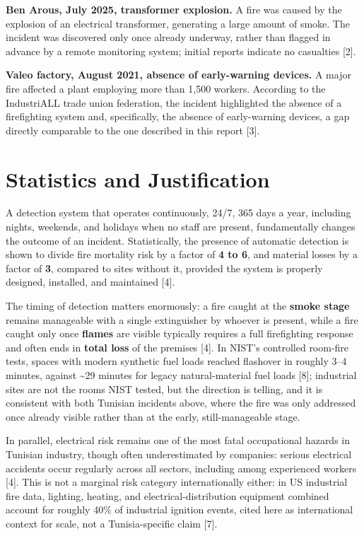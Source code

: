 \documentclass[10pt]{article}
\begin{document}
\textbf{Ben Arous, July 2025, transformer explosion.} A fire was caused by the explosion of an electrical transformer, generating a large amount of smoke. The incident was discovered only once already underway, rather than flagged in advance by a remote monitoring system; initial reports indicate no casualties [2].

\textbf{Valeo factory, August 2021, absence of early-warning devices.} A major fire affected a plant employing more than 1,500 workers. According to the IndustriALL trade union federation, the incident highlighted the absence of a firefighting system and, specifically, the absence of early-warning devices, a gap directly comparable to the one described in this report [3].

\section{Statistics and Justification}
A detection system that operates continuously, 24/7, 365 days a year, including nights, weekends, and holidays when no staff are present, fundamentally changes the outcome of an incident. Statistically, the presence of automatic detection is shown to divide fire mortality risk by a factor of \textbf{4 to 6}, and material losses by a factor of \textbf{3}, compared to sites without it, provided the system is properly designed, installed, and maintained [4].

The timing of detection matters enormously: a fire caught at the \textbf{smoke stage} remains manageable with a single extinguisher by whoever is present, while a fire caught only once \textbf{flames} are visible typically requires a full firefighting response and often ends in \textbf{total loss} of the premises [4]. In NIST's controlled room-fire tests, spaces with modern synthetic fuel loads reached flashover in roughly 3--4 minutes, against \textasciitilde29 minutes for legacy natural-material fuel loads [8]; industrial sites are not the rooms NIST tested, but the direction is telling, and it is consistent with both Tunisian incidents above, where the fire was only addressed once already visible rather than at the early, still-manageable stage.

In parallel, electrical risk remains one of the most fatal occupational hazards in Tunisian industry, though often underestimated by companies: serious electrical accidents occur regularly across all sectors, including among experienced workers [4]. This is not a marginal risk category internationally either: in US industrial fire data, lighting, heating, and electrical-distribution equipment combined account for roughly 40\% of industrial ignition events, cited here as international context for scale, not a Tunisia-specific claim [7].
\end{document}
